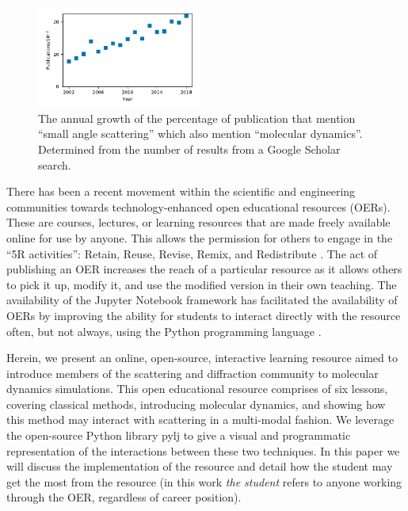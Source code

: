 \documentclass[amsmath,amssymb,twocolumn,superscriptaddress]{revtex4-1}
\begin{document}
%
\begin{figure}
\label{fig:growth}
\includegraphics[width=0.48\textwidth]{figures/chem_data_py.pdf}
\caption{The annual growth of the percentage of publication that mention ``small angle scattering'' which also mention ``molecular dynamics''. Determined from the number of results from a Google Scholar search.}
\end{figure}
%

There has been a recent movement within the scientific and engineering communities towards technology-enhanced open educational resources (OERs).
These are courses, lectures, or learning resources that are made freely available online for use by anyone.
This allows the permission for others to engage in the ``5R activities'': Retain, Reuse, Revise, Remix, and Redistribute \cite{wiley_open_2018}.
The act of publishing an OER increases the reach of a particular resource as it allows others to pick it up, modify it, and use the modified version in their own teaching.
The availability of the Jupyter Notebook framework \cite{kluyver_jupyter_2016} has facilitated the availability of OERs by improving the ability for students to interact directly with the resource often, but not always, using the Python programming language \cite{barba_cybertraining_2017}.

Herein, we present an online, open-source, interactive learning resource aimed to introduce members of the scattering and diffraction community to molecular dynamics simulations.
This open educational resource comprises of six lessons, covering classical methods, introducing molecular dynamics, and showing how this method may interact with scattering in a multi-modal fashion.
We leverage the open-source Python library pylj \cite{mccluskey_pylj_2018} to give a visual and programmatic representation of the interactions between these two techniques.
In this paper we will discuss the implementation of the resource and detail how the student may get the most from the resource (in this work \emph{the student} refers to anyone working through the OER, regardless of career position).
\end{document}
